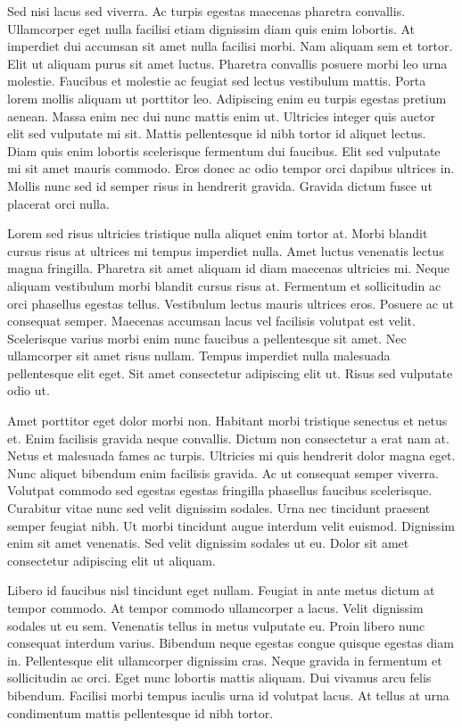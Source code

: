 \documentclass[11pt,a4paper]{article}
\begin{document}
Sed nisi lacus sed viverra. Ac turpis egestas maecenas pharetra convallis. Ullamcorper eget nulla facilisi etiam dignissim diam quis enim lobortis. At imperdiet dui accumsan sit amet nulla facilisi morbi. Nam aliquam sem et tortor. Elit ut aliquam purus sit amet luctus. Pharetra convallis posuere morbi leo urna molestie. Faucibus et molestie ac feugiat sed lectus vestibulum mattis. Porta lorem mollis aliquam ut porttitor leo. Adipiscing enim eu turpis egestas pretium aenean. Massa enim nec dui nunc mattis enim ut. Ultricies integer quis auctor elit sed vulputate mi sit. Mattis pellentesque id nibh tortor id aliquet lectus. Diam quis enim lobortis scelerisque fermentum dui faucibus. Elit sed vulputate mi sit amet mauris commodo. Eros donec ac odio tempor orci dapibus ultrices in. Mollis nunc sed id semper risus in hendrerit gravida. Gravida dictum fusce ut placerat orci nulla.

Lorem sed risus ultricies tristique nulla aliquet enim tortor at. Morbi blandit cursus risus at ultrices mi tempus imperdiet nulla. Amet luctus venenatis lectus magna fringilla. Pharetra sit amet aliquam id diam maecenas ultricies mi. Neque aliquam vestibulum morbi blandit cursus risus at. Fermentum et sollicitudin ac orci phasellus egestas tellus. Vestibulum lectus mauris ultrices eros. Posuere ac ut consequat semper. Maecenas accumsan lacus vel facilisis volutpat est velit. Scelerisque varius morbi enim nunc faucibus a pellentesque sit amet. Nec ullamcorper sit amet risus nullam. Tempus imperdiet nulla malesuada pellentesque elit eget. Sit amet consectetur adipiscing elit ut. Risus sed vulputate odio ut.

Amet porttitor eget dolor morbi non. Habitant morbi tristique senectus et netus et. Enim facilisis gravida neque convallis. Dictum non consectetur a erat nam at. Netus et malesuada fames ac turpis. Ultricies mi quis hendrerit dolor magna eget. Nunc aliquet bibendum enim facilisis gravida. Ac ut consequat semper viverra. Volutpat commodo sed egestas egestas fringilla phasellus faucibus scelerisque. Curabitur vitae nunc sed velit dignissim sodales. Urna nec tincidunt praesent semper feugiat nibh. Ut morbi tincidunt augue interdum velit euismod. Dignissim enim sit amet venenatis. Sed velit dignissim sodales ut eu. Dolor sit amet consectetur adipiscing elit ut aliquam.

Libero id faucibus nisl tincidunt eget nullam. Feugiat in ante metus dictum at tempor commodo. At tempor commodo ullamcorper a lacus. Velit dignissim sodales ut eu sem. Venenatis tellus in metus vulputate eu. Proin libero nunc consequat interdum varius. Bibendum neque egestas congue quisque egestas diam in. Pellentesque elit ullamcorper dignissim cras. Neque gravida in fermentum et sollicitudin ac orci. Eget nunc lobortis mattis aliquam. Dui vivamus arcu felis bibendum. Facilisi morbi tempus iaculis urna id volutpat lacus. At tellus at urna condimentum mattis pellentesque id nibh tortor.
\end{document}

